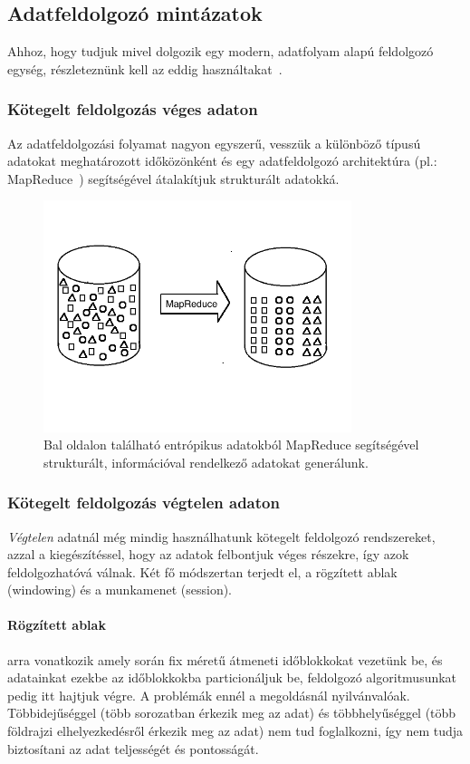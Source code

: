 \documentclass[a4paper,12pt]{article}
\begin{document}
\subsection{Adatfeldolgozó mintázatok}
Ahhoz, hogy tudjuk mivel dolgozik egy modern, adatfolyam alapú feldolgozó egység, részleteznünk kell az eddig használtakat~\cite{tyler}.

\subsubsection{Kötegelt feldolgozás véges adaton}
Az adatfeldolgozási folyamat nagyon egyszerű, vesszük a különböző típusú adatokat meghatározott időközönként és egy adatfeldolgozó architektúra (pl.: MapReduce~\cite{mapreduce}) segítségével átalakítjuk strukturált adatokká.

\begin{figure}[ht!]
\centering
\includegraphics[width=90mm]{img/batch.png}
\caption{Bal oldalon található entrópikus adatokból MapReduce segítségével strukturált, információval rendelkező adatokat generálunk. \cite{tyler} \label{batchreduce}}
\end{figure}

\subsubsection{Kötegelt feldolgozás végtelen adaton}
\textsl{Végtelen} adatnál még mindig használhatunk kötegelt feldolgozó rendszereket, azzal a kiegészítéssel, hogy az adatok felbontjuk véges részekre, így azok feldolgozhatóvá válnak. Két fő módszertan terjedt el, a rögzített ablak (windowing) és a munkamenet (session).

\paragraph{Rögzített ablak}\hspace*{-0.5cm} arra vonatkozik amely során fix méretű átmeneti időblokkokat vezetünk be, és adatainkat ezekbe az időblokkokba particionáljuk be, feldolgozó algoritmusunkat pedig itt hajtjuk végre. A problémák ennél a megoldásnál nyilvánvalóak. Többidejűséggel (több sorozatban érkezik meg az adat) és többhelyűséggel (több földrajzi elhelyezkedésről érkezik meg az adat) nem tud foglalkozni, így nem tudja biztosítani az adat teljességét és pontosságát.
\end{document}
